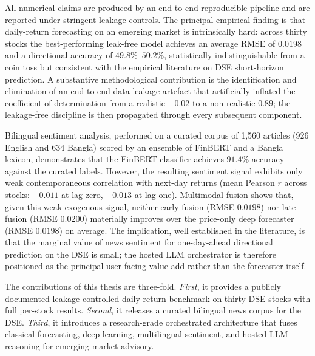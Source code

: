 \documentclass[12pt,a4paper,oneside]{report}
\begin{document}
All numerical claims are produced by an end-to-end reproducible
pipeline and are reported under stringent leakage controls. The
principal empirical finding is that daily-return forecasting on an
emerging market is intrinsically hard: across thirty stocks the
best-performing leak-free model achieves an average \ac{RMSE} of
$0.0198$ and a directional accuracy of $49.8\%$--$50.2\%$,
statistically indistinguishable from a coin toss but consistent with
the empirical literature on DSE short-horizon prediction. A
substantive methodological contribution is the identification and
elimination of an end-to-end data-leakage artefact that artificially
inflated the coefficient of determination from a realistic
$-0.02$ to a non-realistic $0.89$; the leakage-free discipline is
then propagated through every subsequent component.

Bilingual sentiment analysis, performed on a curated corpus of
1{,}560 articles (926 English and 634 Bangla) scored by an ensemble
of FinBERT and a Bangla lexicon, demonstrates that the FinBERT
classifier achieves $91.4\%$ accuracy against the curated labels.
However, the resulting sentiment signal exhibits only weak
contemporaneous correlation with next-day returns (mean Pearson
$r$ across stocks: $-0.011$ at lag zero, $+0.013$ at lag one).
Multimodal fusion shows that, given this weak exogenous signal,
neither early fusion (\ac{RMSE} $0.0198$) nor late fusion
(\ac{RMSE} $0.0200$) materially improves over the price-only deep
forecaster (\ac{RMSE} $0.0198$) on average. The implication,
well established in the literature, is that the marginal value of
news sentiment for one-day-ahead directional prediction on the DSE
is small; the hosted \ac{LLM} orchestrator is therefore positioned
as the principal user-facing value-add rather than the forecaster
itself.

The contributions of this thesis are three-fold. \emph{First}, it
provides a publicly documented leakage-controlled daily-return
benchmark on thirty DSE stocks with full per-stock results.
\emph{Second}, it releases a curated bilingual news corpus for the
DSE. \emph{Third}, it introduces a research-grade orchestrated
architecture that fuses classical forecasting, deep learning,
multilingual sentiment, and hosted \ac{LLM} reasoning for emerging
market advisory.

\newpage

\tableofcontents
\listoffigures
\listoftables
\end{document}
